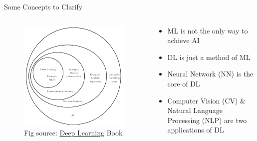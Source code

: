 \documentclass{../TexTemplate/myslide}
\begin{document}
\begin{frame}{Some Concepts to Clarify}
\begin{columns}
\begin{column}{0.5\linewidth}
\begin{figure}
\centering
\includegraphics[width=\linewidth]{fig/dl_venn.jpg}
\caption*{\scriptsize Fig source: \href{http://www.deeplearningbook.org/}{Deep Learning} Book}
\end{figure}
\end{column}
\begin{column}{0.5\linewidth}
\begin{itemize}
	\item ML is not the only way to achieve AI
	\item DL is just a method of ML
	\item Neural Network (NN) is the core of DL
	\item Computer Vision (CV) \& Natural Language Processing (NLP) are two applications of DL
\end{itemize}
\end{column}
\end{columns}
\end{frame}
\end{document}
